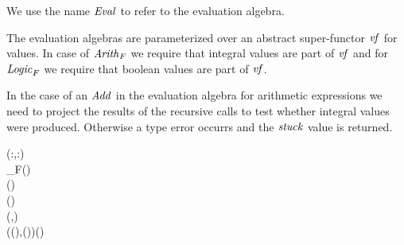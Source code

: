 We use the name \ensuremath{\Conid{Eval}} to refer to the evaluation algebra.
\begin{hscode}\SaveRestoreHook
{}%
%
%
\>[3]{}\;\mathrel{=}\<[E]%
\ColumnHook
\end{hscode}\resethooks
The evaluation algebras are parameterized over an abstract
super-functor \ensuremath{\Varid{vf}} for values. In case of \ensuremath{\Varid{Arith}_F} we require that
integral values are part of \ensuremath{\Varid{vf}} and for \ensuremath{\Varid{Logic}_F} we require that
boolean values are part of \ensuremath{\Varid{vf}}.

In the case of an \ensuremath{\Conid{Add}} in the evaluation algebra for arithmetic
expressions we need to project the results of the recursive calls to
test whether integral values were produced. Otherwise a type error
occurrs and the \ensuremath{\Varid{stuck}} value is returned.
\begin{hscode}\SaveRestoreHook
{}%
%
%
%
%
%
%
%
%
%
%
%
\>[3]{}\;{}\<[13]%
\>[13]{}(\prec:,\prec:)\Rightarrow {}\<[E]%
\\
\>[13]{}\<[15]%
\>[15]{}\;\;_F\;(\;)\;\<[E]%
\\
\>[3]{}\<[5]%
\>[5]{}\;\;(\;){}\<[32]%
\>[32]{}\mathrel{=}{}\<[32E]%
\>[35]{}\;\<[E]%
\\
\>[3]{}\<[5]%
\>[5]{}\;\;(\;\;){}\<[32]%
\>[32]{}\mathrel{=}{}\<[32E]%
\\
\>[5]{}\<[7]%
\>[7]{}\;(\;,\;)\;\<[E]%
\\
\>[7]{}\<[9]%
\>[9]{}(\;(\;),\;(\;)){}\<[42]%
\>[42]{}\to {}\;(\mathbin{+}){}\<[E]%
\\
\>[7]{}\<[9]%
\>[9]{}\anonymous {}\<[42]%
\>[42]{}\to {}\<[E]%
\ColumnHook
\end{hscode}\resethooks
